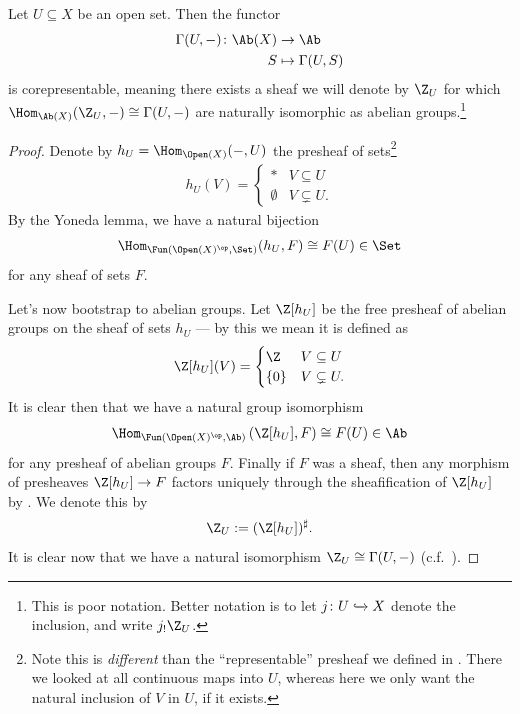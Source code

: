 \documentclass[11pt]{book}
\begin{document}
\begin{example}
\label{exa:ZU-sheaf}
Let $U \subseteq X$ be an open set. Then the functor
\begin{align*}
    \Gamma(U,-) \colon \Ab(X) &\to \Ab \\
    S &\mapsto \Gamma(U,S)
\end{align*}
is corepresentable, meaning there exists a sheaf we will denote by $\Z_U$ for which $\Hom_{\Ab(X)}(\Z_U,-) \cong \Gamma(U,-)$ are naturally isomorphic as abelian groups.\footnote{This is poor notation. Better notation is to let $j \colon U \xhookrightarrow{} X$ denote the inclusion, and write $j_! \Z_U$.}
\end{example}
\begin{proof}
Denote by $h_U = \Hom_{\Open(X)}(-,U)$ the presheaf of sets\footnote{Note this is \emph{different} than the ``representable'' presheaf we defined in . There we looked at all continuous maps into $U$, whereas here we only want the natural inclusion of $V$ in $U$, if it exists.}
\begin{align*}
    h_U(V) = \begin{cases} \ast & V \subseteq U \\ \emptyset & V \subsetneq U. \end{cases}
\end{align*}
By the Yoneda lemma, we have a natural bijection
\begin{align*}
    \Hom_{\Fun(\Open(X)^\op,\Set)}(h_U,F) \cong F(U) \in \Set
\end{align*}
for any sheaf of sets $F$.

Let's now bootstrap to abelian groups. Let $\Z[h_U]$ be the free presheaf of abelian groups on the sheaf of sets $h_U$ --- by this we mean it is defined as
\begin{align*}
    \Z[h_U](V) = \begin{cases} \Z & V \subseteq U \\ \{0\} & V \subsetneq U. \end{cases}
\end{align*}
It is clear then that we have a natural group isomorphism
\begin{align*}
    \Hom_{\Fun(\Open(X)^\op,\Ab)} \left( \Z[h_U],F \right)\cong F(U) \in \Ab
\end{align*}
for any presheaf of abelian groups $F$. Finally if $F$ was a sheaf, then any morphism of presheaves $\Z[h_U] \to F$ factors uniquely through the sheafification of $\Z[h_U]$ by . We denote this by
\begin{align*}
    \Z_U := (\Z[h_U])^\sharp.
\end{align*}
It is clear now that we have a natural isomorphism $\Z_U\cong\Gamma(U,-)$ (c.f.~\cite[03CP,03CQ]{Stacks}).
\end{proof}
\end{document}
